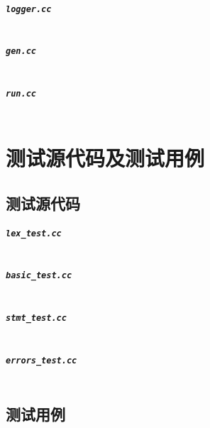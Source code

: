 \documentclass[format=draft,language=chinese,category=academic-report]{hustreport}
\begin{document}
\paragraph{{\tt logger.cc}}
\inputminted[linenos=true]{cpp}{../../src/project/Parser/logger.cc}
\paragraph{{\tt gen.cc}}
\inputminted[linenos=true]{cpp}{../../src/project/Parser/gen.cc}
\paragraph{{\tt run.cc}}
\inputminted[linenos=true]{cpp}{../../src/project/Parser/run.cc}

\chapter{测试源代码及测试用例}\label{ch:test}
\section{测试源代码}
\paragraph{{\tt lex\_test.cc}}
\inputminted[linenos=true]{cpp}{../../test/project/lex_test.cc}
\paragraph{{\tt basic\_test.cc}}
\inputminted[linenos=true]{cpp}{../../test/project/basic_test.cc}
\paragraph{{\tt stmt\_test.cc}}
\inputminted[linenos=true]{cpp}{../../test/project/stmt_test.cc}
\paragraph{{\tt errors\_test.cc}}
\inputminted[linenos=true]{cpp}{../../test/project/errors_test.cc}

\section{测试用例}
\inputminted[linenos=true]{json}{../../test/project/cases/lex.json}

\inputminted[linenos=true]{cpp}{../../test/project/cases/basic.c}
\inputminted[linenos=true]{cpp}{../../test/project/cases/for.c}
\inputminted[linenos=true]{cpp}{../../test/project/cases/if.c}
\inputminted[linenos=true]{cpp}{../../test/project/cases/while.c}

\inputminted[linenos=true]{cpp}{../../test/project/cases/errors/e_enum_id.c}
\inputminted[linenos=true]{cpp}{../../test/project/cases/errors/e_func_dup_para.c}
\end{document}
